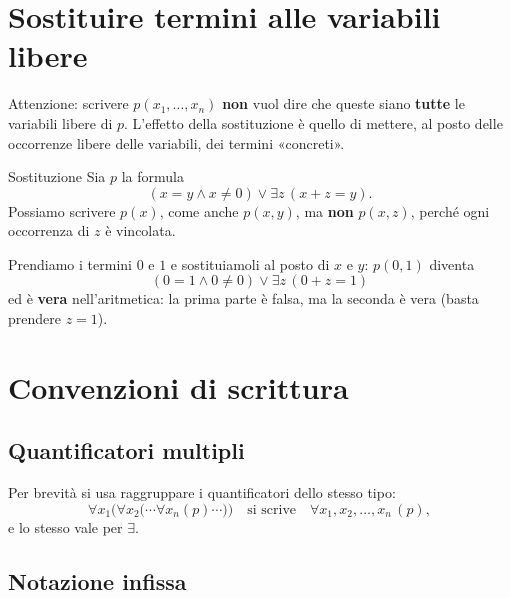 \section{Sostituire termini alle variabili libere}\label{sec:sostituzione-termini}


Attenzione: scrivere $p(x_1, \dots, x_n)$ \textbf{non} vuol dire che queste siano \textbf{tutte} le variabili libere di $p$.
L'effetto della sostituzione è quello di mettere, al posto delle occorrenze libere delle variabili, dei termini «concreti».

\begin{esempio}{Sostituzione}
    Sia $p$ la formula
    \[ (x = y \wedge x \neq 0) \vee \exists z\,(x + z = y). \]
    Possiamo scrivere $p(x)$, come anche $p(x, y)$, ma \textbf{non} $p(x, z)$, perché ogni occorrenza di $z$ è vincolata.

    Prendiamo i termini $0$ e $1$ e sostituiamoli al posto di $x$ e $y$: $p(0, 1)$ diventa
    \[ (0 = 1 \wedge 0 \neq 0) \vee \exists z\,(0 + z = 1) \]
    ed è \textbf{vera} nell'aritmetica: la prima parte è falsa, ma la seconda è vera (basta prendere $z = 1$).
\end{esempio}

\section{Convenzioni di scrittura}\label{sec:convenzioni}

\subsection{Quantificatori multipli}

Per brevità si usa raggruppare i quantificatori dello stesso tipo:
\[ \forall x_1 \Big(\forall x_2 \big(\cdots \forall x_n (p) \cdots\big)\Big) \quad \text{si scrive} \quad \forall x_1, x_2, \dots, x_n\,(p), \]
e lo stesso vale per $\exists$.

\subsection{Notazione infissa}

